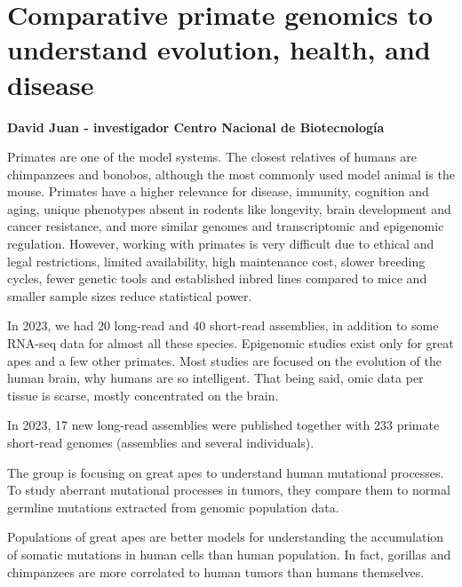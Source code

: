 \section{Comparative primate genomics to understand evolution, health, and disease}
\textbf{David Juan - investigador Centro Nacional de Biotecnología}

Primates are one of the model systems. The closest relatives of humans are chimpanzees and bonobos, although the most commonly used model animal is the mouse. Primates have a higher relevance for disease, immunity, cognition and aging, unique phenotypes absent in rodents like longevity, brain development and cancer resistance, and more similar genomes and transcriptomic and epigenomic regulation. However, working with primates is very difficult due to ethical and legal restrictions, limited availability, high maintenance cost, slower breeding cycles, fewer genetic tools and established inbred lines compared to mice and smaller sample sizes reduce statistical power. 

In 2023, we had 20 long-read and 40 short-read assemblies, in addition to some RNA-seq data for almost all these species. Epigenomic studies exist only for great apes and a few other primates. 
Most studies are focused on the evolution of the human brain, why humans are so intelligent. That being said, omic data per tissue is scarse, mostly concentrated on the brain. 

In 2023, 17 new long-read assemblies were published together with 233 primate short-read genomes (assemblies and several individuals).

The group is focusing on great apes to understand human mutational processes. To study aberrant mutational processes in tumors, they compare them to normal germline mutations extracted from genomic population data.  

Populations of great apes are better models for understanding the accumulation of somatic mutations in human cells than human population. In fact, gorillas and chimpanzees are more correlated to human tumors than humans themselves.

